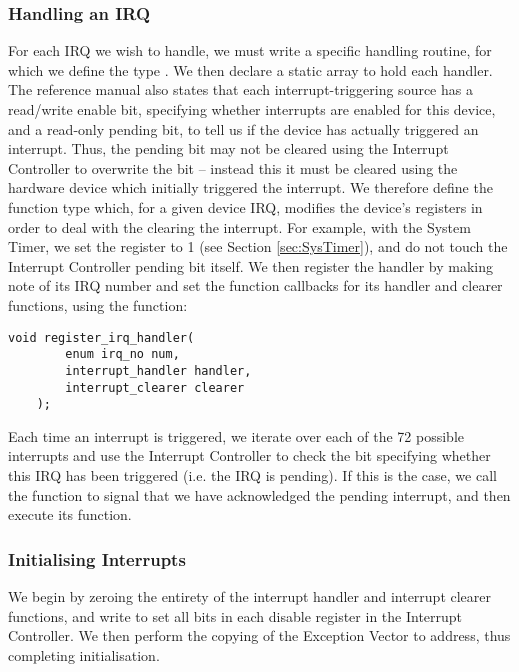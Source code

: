     \subsubsection{Handling an IRQ}
        \label{sec:IRQ_clearing}
        For each IRQ we wish to handle, we must write a specific handling
        routine, for which we define the type . We then
        declare a static array to hold each handler. The reference manual also
        states \cite[pg.~109]{BCM2835} that each interrupt-triggering source has
        a read/write enable bit, specifying whether interrupts are enabled for
        this device, and a read-only pending bit, to tell us if the device has
        actually triggered an interrupt. Thus, the pending bit may not be
        cleared using the Interrupt Controller to overwrite the bit -- instead
        this it must be cleared using the hardware device which initially
        triggered the interrupt. We therefore define the function type
         which, for a given device IRQ, modifies the
        device's registers in order to deal with the clearing the interrupt. For
        example, with the System Timer, we set the  register to 1
        (see Section \ref{sec:SysTimer}), and do not touch the Interrupt
        Controller pending bit itself. We then register the handler by making
        note of its IRQ number and set the function callbacks for its handler
        and clearer functions, using the function:
        \lstset{language=c}
        \begin{lstlisting}[caption={Registering an IRQ}, captionpos=b]
void register_irq_handler(
        enum irq_no num,
        interrupt_handler handler,
        interrupt_clearer clearer
    );
        \end{lstlisting}

        Each time an interrupt is triggered, we iterate over each of the 72
        possible interrupts and use the Interrupt Controller to check the
        bit specifying whether this IRQ has been triggered (i.e. the IRQ is
        pending). If this is the case, we call the  function to
        signal that we have acknowledged the pending interrupt, and then execute
        its  function.

    \subsubsection{Initialising Interrupts}
        We begin by zeroing the entirety of the interrupt handler and interrupt
        clearer functions, and write  to set all bits in each
        disable register in the Interrupt Controller. We then perform the
        copying of the Exception Vector to address, thus completing
        initialisation.

